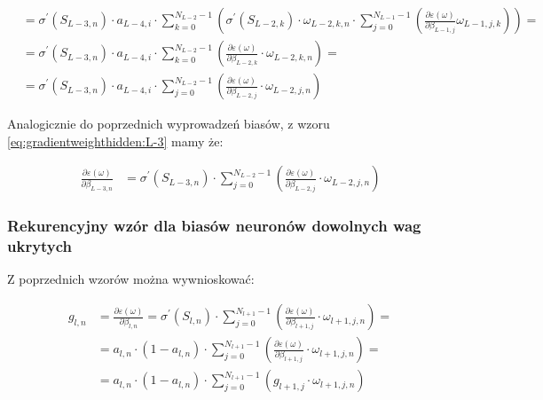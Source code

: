 \documentclass[]{article}
\begin{document}
\begin{equation}
\begin{split}
					&= \sigma^{\prime} \left( S_{L-3,n} \right) \cdot a_{L-4,i} \cdot \sum\limits_{k=0}^{N_{L-2}-1} \left( \sigma^{\prime} \left( S_{L-2,k} \right) \cdot \omega_{L-2,k,n} \cdot \sum\limits_{j=0}^{N_{L-1}-1} \left( \frac{ \partial \varepsilon \left(\omega\right) }{ \partial \beta_{L-1,j} } \omega_{L-1,j,k} \right) \right) = \\
					&= \sigma^{\prime} \left( S_{L-3,n} \right) \cdot a_{L-4,i} \cdot \sum\limits_{k=0}^{N_{L-2}-1} \left( \frac{ \partial \varepsilon \left( \omega \right) }{ \partial \beta_{L-2,k} } \cdot \omega_{L-2,k,n} \right) = \\
					&= \sigma^{\prime} \left( S_{L-3,n} \right) \cdot a_{L-4,i} \cdot \sum\limits_{j=0}^{N_{L-2}-1} \left( \frac{ \partial \varepsilon \left( \omega \right) }{ \partial \beta_{L-2,j} } \cdot \omega_{L-2,j,n} \right)
				\end{split}
			\end{equation}
			
			Analogicznie do poprzednich wyprowadzeń biasów, z wzoru \ref{eq:gradientweighthidden:L-3} mamy że:
			
			\begin{equation} \label{eq:gradientbiashidden:L-3}
				\begin{split}
					\frac{ \partial \varepsilon\left( \omega \right) }{ \partial \beta_{L-3,n} } &= \sigma^{\prime} \left( S_{L-3,n} \right) \cdot \sum\limits_{j=0}^{N_{L-2}-1} \left( \frac{ \partial \varepsilon \left( \omega \right) }{ \partial \beta_{L-2,j} } \cdot \omega_{L-2,j,n} \right)
				\end{split}
			\end{equation}
			
			
		\subsubsection{Rekurencyjny wzór dla biasów neuronów dowolnych wag ukrytych}
		
		Z poprzednich wzorów można wywnioskować:
		
		\begin{equation} \label{eq:gradientbiashidden}
			\begin{split}
				g_{l,n} &= \frac{ \partial \varepsilon\left( \omega \right) }{ \partial \beta_{l,n} } = \sigma^{\prime} \left( S_{l,n} \right) \cdot \sum\limits_{j=0}^{N_{l+1}-1} \left( \frac{ \partial \varepsilon \left( \omega \right) }{ \partial \beta_{l+1,j} } \cdot \omega_{l+1,j,n} \right) = \\
				&= a_{l,n} \cdot \left( 1 - a_{l,n} \right) \cdot \sum\limits_{j=0}^{N_{l+1}-1} \left( \frac{ \partial \varepsilon \left( \omega \right) }{ \partial \beta_{l+1,j} } \cdot \omega_{l+1,j,n} \right) = \\
				&= a_{l,n} \cdot \left( 1 - a_{l,n} \right) \cdot \sum\limits_{j=0}^{N_{l+1}-1} \left( g_{l+1,j} \cdot \omega_{l+1,j,n} \right)
			\end{split}
		\end{equation}
		
\end{document}
